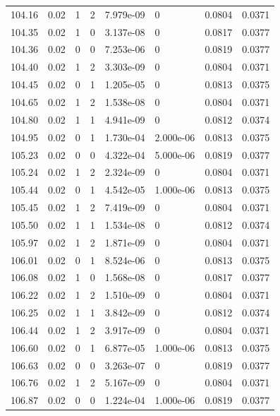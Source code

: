 \documentclass[preview]{standalone}
\begin{document}
{{{{{{{{{{{{{{{{\begin{tabular}{L{1.2cm}C{1.2cm} C{0.3cm}C{0.5cm} C{1.4cm}C{1.4cm} C{1.4cm}C{1.4cm}}
  104.16  &  0.02  & 1     &  2 &  7.979e-09  & 0  & 0.0804 &  0.0371   \\ 
  104.35  &  0.02  & 1     &  0 &  3.137e-08  & 0  & 0.0817 &  0.0377   \\ 
  104.36  &  0.02  & 0     &  0 &  7.253e-06  & 0  & 0.0819 &  0.0377   \\ 
  104.40  &  0.02  & 1     &  2 &  3.303e-09  & 0  & 0.0804 &  0.0371   \\ 
  104.45  &  0.02  & 0     &  1 &  1.205e-05  & 0  & 0.0813 &  0.0375   \\ 
  104.65  &  0.02  & 1     &  2 &  1.538e-08  & 0  & 0.0804 &  0.0371   \\ 
  104.80  &  0.02  & 1     &  1 &  4.941e-09  & 0  & 0.0812 &  0.0374   \\ 
  104.95  &  0.02  & 0     &  1 &  1.730e-04  & 2.000e-06  & 0.0813 &  0.0375   \\ 
  105.23  &  0.02  & 0     &  0 &  4.322e-04  & 5.000e-06  & 0.0819 &  0.0377   \\ 
  105.24  &  0.02  & 1     &  2 &  2.324e-09  & 0  & 0.0804 &  0.0371   \\ 
  105.44  &  0.02  & 0     &  1 &  4.542e-05  & 1.000e-06  & 0.0813 &  0.0375   \\ 
  105.45  &  0.02  & 1     &  2 &  7.419e-09  & 0  & 0.0804 &  0.0371   \\ 
  105.50  &  0.02  & 1     &  1 &  1.534e-08  & 0  & 0.0812 &  0.0374   \\ 
  105.97  &  0.02  & 1     &  2 &  1.871e-09  & 0  & 0.0804 &  0.0371   \\ 
  106.01  &  0.02  & 0     &  1 &  8.524e-06  & 0  & 0.0813 &  0.0375   \\ 
  106.08  &  0.02  & 1     &  0 &  1.568e-08  & 0  & 0.0817 &  0.0377   \\ 
  106.22  &  0.02  & 1     &  2 &  1.510e-09  & 0  & 0.0804 &  0.0371   \\ 
  106.25  &  0.02  & 1     &  1 &  3.842e-09  & 0  & 0.0812 &  0.0374   \\ 
  106.44  &  0.02  & 1     &  2 &  3.917e-09  & 0  & 0.0804 &  0.0371   \\ 
  106.60  &  0.02  & 0     &  1 &  6.877e-05  & 1.000e-06  & 0.0813 &  0.0375   \\ 
  106.63  &  0.02  & 0     &  0 &  3.263e-07  & 0  & 0.0819 &  0.0377   \\ 
  106.76  &  0.02  & 1     &  2 &  5.167e-09  & 0  & 0.0804 &  0.0371   \\ 
  106.87  &  0.02  & 0     &  0 &  1.224e-04  & 1.000e-06  & 0.0819 &  0.0377   \\ 

\end{tabular}}}}}}}}}}}}}}}}}
\end{document}

